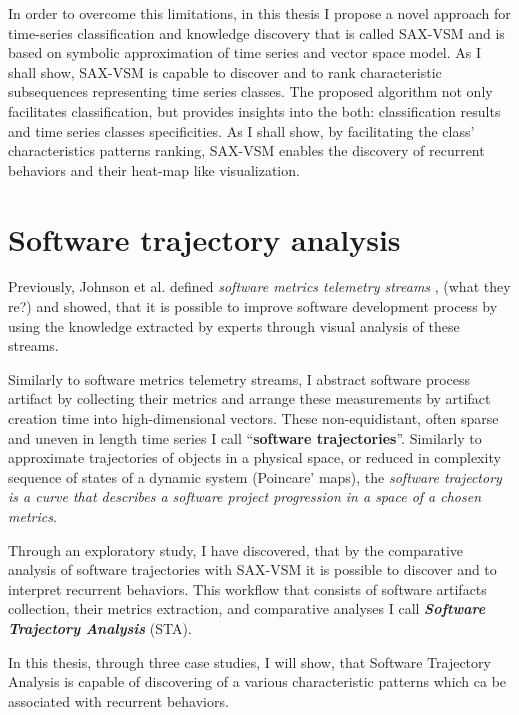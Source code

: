 In order to overcome this limitations, in this thesis I propose a novel approach for time-series classification and knowledge discovery that is called SAX-VSM and is based on symbolic approximation of time series and vector space model. 
As I shall show, SAX-VSM is capable to discover and to rank characteristic subsequences representing time series classes. The proposed algorithm not only facilitates classification, but provides insights into the both: classification results 
and time series classes specificities. As I shall show, by facilitating the class' characteristics patterns ranking,
SAX-VSM enables the discovery of recurrent behaviors and their heat-map like visualization. 

\section{Software trajectory analysis}\label{section_trajectory_definition}
Previously, Johnson et al. defined \textit{software metrics telemetry streams} \cite{citeulike:12550871}, 
(what they re?) and showed, that it is possible to improve software development process by using the 
knowledge extracted by experts through visual analysis of these streams.
 
Similarly to software metrics telemetry streams, I abstract software process artifact by collecting their 
metrics and arrange these measurements by artifact creation time into high-dimensional vectors. 
These non-equidistant, often sparse and uneven in length time series 
I call ``\textbf{software trajectories}''. Similarly to approximate trajectories of objects in 
a physical space, or reduced in complexity sequence of states of a dynamic system (Poincare' maps), 
the \textit{software trajectory is a curve that describes a software project progression in a space 
of a chosen metrics}.

Through an exploratory study, I have discovered, that by the comparative analysis of software trajectories 
with SAX-VSM it is possible to discover and to interpret recurrent behaviors. This workflow that 
consists of software artifacts collection, their metrics extraction, and comparative analyses I call 
\textit{\textbf{Software Trajectory Analysis}} (STA). 

In this thesis, through three case studies, I will show, that Software Trajectory Analysis is capable 
of discovering of a various characteristic patterns which ca be associated with recurrent behaviors.


